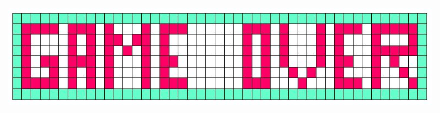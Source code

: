 \documentclass[11pt]{article}
\begin{document}
		\begin{figure}[h]\centering
		  \includegraphics[width=.8\textwidth]{Images/gameover_screen.png}
		  \label{gameover_screen}
		\end{figure}		
	
	
\end{document}
